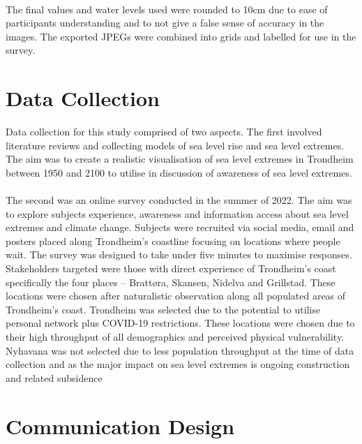 \paragraph{}
The final values and water levels used were rounded to 10cm due to ease of participants understanding and to not give a false sense of accuracy in the images. The exported JPEGs were combined into grids and labelled for use in the survey. 



\section{Data Collection}

Data collection for this study comprised of two aspects.  The first involved literature reviews and collecting models of sea level rise and sea level extremes. The aim was to create a realistic visualisation of sea level extremes in Trondheim between 1950 and 2100 to utilise in discussion of awareness of sea level extremes. 
\paragraph{}

The second was an online survey conducted in the summer of 2022. The aim was to explore subjects experience, awareness and information access about sea level extremes and climate change. Subjects were recruited via social media, email and posters placed along Trondheim’s coastline focusing on locations where people wait. The survey was designed to take under five minutes to maximise responses. Stakeholders targeted were those with direct experience of Trondheim’s coast specifically the four places – Brattøra, Skansen, Nidelva and Grillstad. These locations were chosen after naturalistic observation along all populated areas of Trondheim’s coast. Trondheim was selected due to the potential to utilise personal network plus COVID-19 restrictions. These locations were chosen due to their high throughput of all demographics and perceived physical vulnerability. Nyhavana was not selected due to less population throughput at the time of data collection and as the major impact on sea level extremes is ongoing construction and related subsidence \cite{miljoenheten_og_byplankontoret_trondheim_kommune_9-notat-om-havnivastigning-og-stormflo---hensyn-i-arealplanlegging-nyhavnapdf_2020}




\section{Communication Design}

